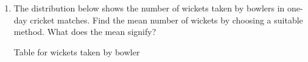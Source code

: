 \renewcommand{\theequation}{\theenumi}
\begin{enumerate}[label=\arabic*.,ref=\thesubsection.\theenumi]
\item The distribution below shows the number of wickets taken by bowlers in one-day cricket matches. Find the mean number of wickets by choosing a suitable
method. What does the mean signify?
\begin{table}[!ht]
	\centering
	
	\caption{ Table for wickets taken by bowler}
\end{table}
\end{enumerate}